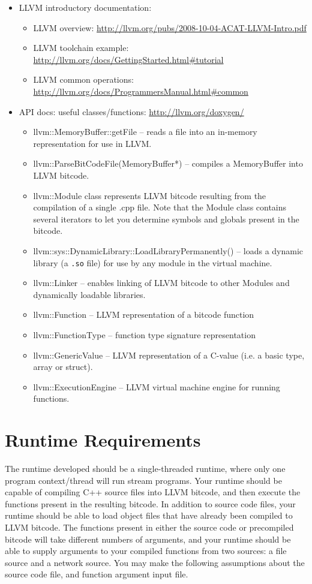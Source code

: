 \documentclass{article}
\begin{document}
\begin{itemize}
\item LLVM introductory documentation:
\begin{itemize}
\item LLVM overview: \url{http://llvm.org/pubs/2008-10-04-ACAT-LLVM-Intro.pdf}
\item LLVM toolchain example: \url{http://llvm.org/docs/GettingStarted.html#tutorial}
\item LLVM common operations: \url{http://llvm.org/docs/ProgrammersManual.html\#common}
\end{itemize}

\item API docs: useful classes/functions: \url{http://llvm.org/doxygen/}
\begin{itemize}
\item llvm::MemoryBuffer::getFile -- reads a file into an in-memory representation for use in LLVM.
\item llvm::ParseBitCodeFile(MemoryBuffer*) -- compiles a MemoryBuffer into LLVM bitcode.
\item llvm::Module class represents LLVM bitcode resulting from the compilation of a single .cpp file. Note that the Module class contains several iterators to let you determine symbols and globals present in the bitcode.
\item llvm::sys::DynamicLibrary::LoadLibraryPermanently() -- loads a dynamic library (a \texttt{.so} file) for use by any module in the virtual machine.
\item llvm::Linker -- enables linking of LLVM bitcode to other Modules and dynamically loadable libraries.
\item llvm::Function -- LLVM representation of a bitcode function 
\item llvm::FunctionType -- function type signature representation
\item llvm::GenericValue -- LLVM representation of a C-value (i.e. a basic type, array or struct).
\item llvm::ExecutionEngine -- LLVM virtual machine engine for running functions.
\end{itemize}

\end{itemize}

\section{Runtime Requirements}
The runtime developed should be a single-threaded runtime, where only one program context/thread will run stream programs. Your runtime should be capable of compiling C++ source files into LLVM bitcode, and then execute the functions present in the resulting bitcode. In addition to source code files, your runtime should be able to load object files that have already been compiled to LLVM bitcode. The functions present in either the source code or precompiled bitcode will take different numbers of arguments, and your runtime should be able to supply arguments to your compiled functions from two sources: a file source and a network source. You may make the following assumptions about the source code file, and function argument input file. 
\end{document}
